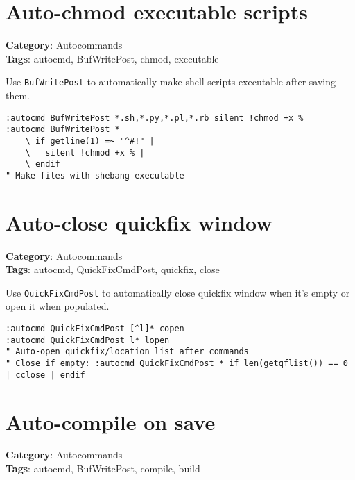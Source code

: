{\section{Auto-chmod executable scripts}

\textbf{Category}: Autocommands\\ \textbf{Tags}: autocmd, BufWritePost, chmod, executable
\vspace{0.5cm}

Use {\footnotesize \Verb§BufWritePost§} to automatically make shell scripts executable after saving them.

\begin{Exa*}{}
\begin{Verbatim}[fontsize=\footnotesize, breaklines, breakanywhere]
:autocmd BufWritePost *.sh,*.py,*.pl,*.rb silent !chmod +x %
:autocmd BufWritePost * 
    \ if getline(1) =~ "^#!" | 
    \   silent !chmod +x % | 
    \ endif
" Make files with shebang executable
\end{Verbatim}
\end{Exa*}

\section{Auto-close quickfix window}

\textbf{Category}: Autocommands\\ \textbf{Tags}: autocmd, QuickFixCmdPost, quickfix, close
\vspace{0.5cm}

Use {\footnotesize \Verb§QuickFixCmdPost§} to automatically close quickfix window when it's empty or open it when populated.

\begin{Exa*}{}
\begin{Verbatim}[fontsize=\footnotesize, breaklines, breakanywhere]
:autocmd QuickFixCmdPost [^l]* copen
:autocmd QuickFixCmdPost l* lopen
" Auto-open quickfix/location list after commands
" Close if empty: :autocmd QuickFixCmdPost * if len(getqflist()) == 0 | cclose | endif
\end{Verbatim}
\end{Exa*}

\section{Auto-compile on save}

\textbf{Category}: Autocommands\\ \textbf{Tags}: autocmd, BufWritePost, compile, build
\vspace{0.5cm}

}
